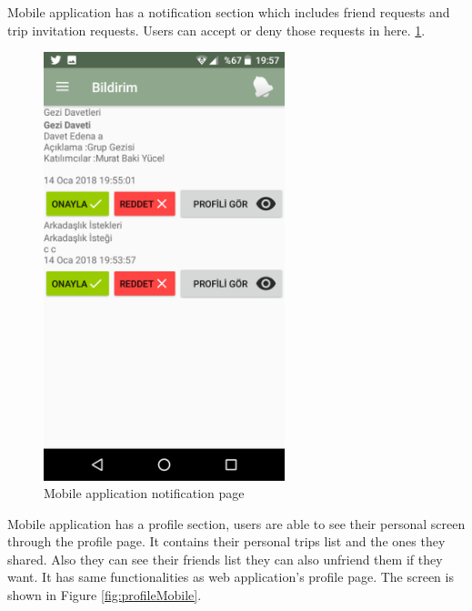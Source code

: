 \newpage

Mobile application has a notification section which includes friend requests and trip invitation requests. Users can accept or deny those requests in here.
\ref{fig:notificationMobile}.

\begin{figure}[!htbp]
\centering
\includegraphics[width=70mm,scale=0.7]{projectChapters/images/notificationMobile.png}
\caption{Mobile application notification page}
\label{fig:notificationMobile}
\end{figure}

\newpage

Mobile application has a profile section, users are able to see their personal screen through the profile page. It contains their personal trips list and the ones they shared. Also they can see their friends list they can also unfriend them if they want. It has same functionalities as web application's profile page. The screen is shown in Figure 
\ref{fig:profileMobile}.

